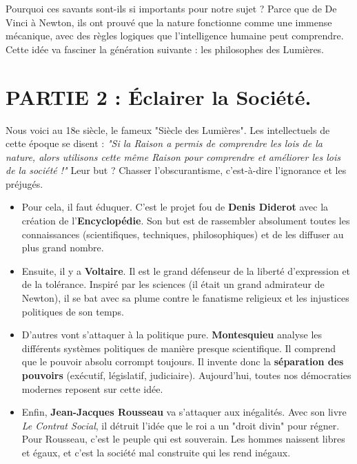 \documentclass[12pt, a4paper]{article}
\begin{document}
Pourquoi ces savants sont-ils si importants pour notre sujet ? Parce que de De Vinci à Newton, ils ont prouvé que la nature fonctionne comme une immense mécanique, avec des règles logiques que l'intelligence humaine peut comprendre. Cette idée va fasciner la génération suivante : les philosophes des Lumières.


\vspace{0.5cm}
\clearpage
\section*{PARTIE 2 : Éclairer la Société.}

Nous voici au 18e siècle, le fameux "Siècle des Lumières". Les intellectuels de cette époque se disent : \textit{"Si la Raison a permis de comprendre les lois de la nature, alors utilisons cette même Raison pour comprendre et améliorer les lois de la société !"} Leur but ? Chasser l'obscurantisme, c'est-à-dire l'ignorance et les préjugés. 

\begin{itemize}
    \item Pour cela, il faut éduquer. C'est le projet fou de \textbf{Denis Diderot} avec la création de l'\textbf{Encyclopédie}. Son but est de rassembler absolument toutes les connaissances (scientifiques, techniques, philosophiques) et de les diffuser au plus grand nombre.\\
    
    \item Ensuite, il y a \textbf{Voltaire}. Il est le grand défenseur de la liberté d'expression et de la tolérance. Inspiré par les sciences (il était un grand admirateur de Newton), il se bat avec sa plume contre le fanatisme religieux et les injustices politiques de son temps.\\
    
    \item D'autres vont s'attaquer à la politique pure. \textbf{Montesquieu} analyse les différents systèmes politiques de manière presque scientifique. Il comprend que le pouvoir absolu corrompt toujours. Il invente donc la \textbf{séparation des pouvoirs} (exécutif, législatif, judiciaire). Aujourd'hui, toutes nos démocraties modernes reposent sur cette idée.\\
    
    \item Enfin, \textbf{Jean-Jacques Rousseau} va s'attaquer aux inégalités. Avec son livre \textit{Le Contrat Social}, il détruit l'idée que le roi a un "droit divin" pour régner. Pour Rousseau, c'est le peuple qui est souverain. Les hommes naissent libres et égaux, et c'est la société mal construite qui les rend inégaux.\\
\end{itemize}
\end{document}
